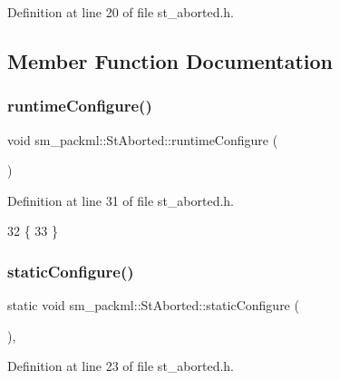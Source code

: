 Definition at line 20 of file st\+\_\+aborted.\+h.



\subsection{Member Function Documentation}
\mbox{\label{structsm__packml_1_1StAborted_ae24353777c69ff47bf657ba4314fb0c3}} 
\subsubsection{\texorpdfstring{runtime\+Configure()}{runtimeConfigure()}}
{\footnotesize\ttfamily void sm\+\_\+packml\+::\+St\+Aborted\+::runtime\+Configure (\begin{DoxyParamCaption}{ }\end{DoxyParamCaption})\hspace{0.3cm}{\ttfamily [inline]}}



Definition at line 31 of file st\+\_\+aborted.\+h.


\begin{DoxyCode}
32     \{
33     \}
\end{DoxyCode}
\mbox{\label{structsm__packml_1_1StAborted_a73f83ae5cecaba62aa744b947d2598b3}} 
\subsubsection{\texorpdfstring{static\+Configure()}{staticConfigure()}}
{\footnotesize\ttfamily static void sm\+\_\+packml\+::\+St\+Aborted\+::static\+Configure (\begin{DoxyParamCaption}{ }\end{DoxyParamCaption})\hspace{0.3cm}{\ttfamily [inline]}, {\ttfamily [static]}}



Definition at line 23 of file st\+\_\+aborted.\+h.



